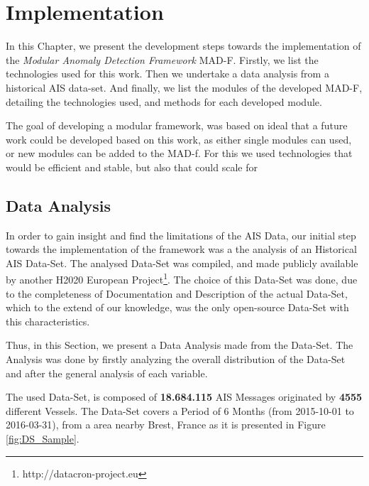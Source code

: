 \chapter{Implementation}
\label{chapter:Chapter 4}

In this Chapter, we present the development steps towards the implementation of the \emph{Modular Anomaly Detection Framework} MAD-F. Firstly, we list the technologies used for this work. Then we undertake a data analysis from a historical AIS data-set. And finally, we list the modules of the developed MAD-F, detailing the technologies used, and methods for each developed module.

The goal of developing a modular framework, was based on ideal that a future work could be developed based on this work, as either single modules can used, or new modules can be added to the MAD-f. For this we used technologies that would be efficient and stable, but also that could scale for 

\section{Data Analysis}
\label{section: Data Analysis}
In order to gain insight and find the limitations of the AIS Data, our initial step towards the implementation of the framework was a the analysis of an Historical AIS Data-Set. The analysed Data-Set was compiled, and made publicly available by another H2020 European Project\footnote{http://datacron-project.eu}.  The choice of this Data-Set was done, due to the completeness of Documentation and Description of the actual Data-Set, which to the extend of our knowledge, was the only open-source Data-Set with this characteristics.  

Thus, in this Section, we present a Data Analysis made from the Data-Set\cite{DATASET}. The Analysis was done by firstly analyzing the overall distribution of the Data-Set and after the general analysis of each variable.  

The used Data-Set, is composed of \textbf{18.684.115} AIS Messages originated by \textbf{4555} different Vessels. The Data-Set covers a Period of 6 Months (from 2015-10-01 to 2016-03-31), from a area nearby Brest, France as it is presented in Figure \ref{fig:DS_Sample}.

